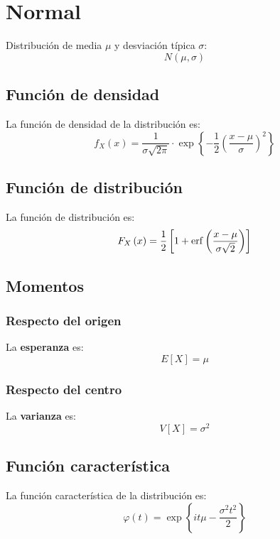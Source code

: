 \section{Normal}
\label{sec:normal}
Distribución de media $\mu$ y desviación típica $\sigma$:
\[
\boxed{N\left( \mu, \sigma \right)}
\]

\subsection{Función de densidad}
La función de densidad de la distribución es:
\[
f_X \left( x \right) = \frac{1}{\sigma \sqrt{2 \pi}} \cdot \exp\left\{ -\frac{1}{2} \left( \frac{x - \mu}{\sigma} \right)^2 \right\}
\]

\subsection{Función de distribución}
La función de distribución es:
\[
F_X\left( x \right) = \frac{1}{2} \left[ 1 + \operatorname{erf}\left( \frac{x - \mu}{\sigma \sqrt{2}} \right) \right]
\]

\subsection{Momentos}

\subsubsection*{Respecto del origen}
La \textbf{esperanza} es: 
\[
    E\left[ X \right] = \mu
\]
\subsubsection*{Respecto del centro}
La \textbf{varianza} es:
\[
    V\left[ X \right] = \sigma^2
\]

\subsection{Función característica}
La función característica de la distribución es:
\[
\varphi\left( t \right) = \exp\left\{ it \mu - \frac{\sigma^2 t^2}{2} \right\}
\]

